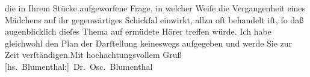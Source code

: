 \begin{ledgroupsized}[t]{13cm}
               die in Ihrem Stücke aufgeworfene
               Frage, in welcher Weiſe die Vergangenheit eines Mädchens auf ihr gegenwärtiges
               Schickſal einwirkt, allzu oft behandelt iſt, ſo daß augenblicklich dieſes Thema auf
               ermüdete Hörer treffen würde. Ich habe gleichwohl den Plan der Darſtellung keineswegs
               aufgegeben und werde Sie zur Zeit verſtändigen.\hspace*{2.5em}Mit
               hochachtungsvollem Gruß\pend
           \pstart \spacefill\mbox{{[}hs. Blumenthal:{]} Dr. Osc. Blumenthal}\pend{}\endnumbering{}\end{ledgroupsized}  \newcommand{\dateiname}{L00253}\newcommand{\titel}{Oscar Blumenthal an Arthur Schnitzler, 12. 8. 1893}\newcommand{\editorInnen}{Martin Anton Müller und Gerd-Hermann Susen}
      